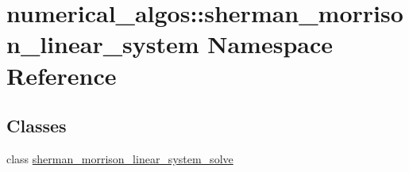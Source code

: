 \hypertarget{namespacenumerical__algos_1_1sherman__morrison__linear__system}{\section{numerical\-\_\-algos\-:\-:sherman\-\_\-morrison\-\_\-linear\-\_\-system Namespace Reference}
\label{namespacenumerical__algos_1_1sherman__morrison__linear__system}
}
\subsection*{Classes}
\begin{DoxyCompactItemize}
\item 
class \hyperlink{classnumerical__algos_1_1sherman__morrison__linear__system_1_1sherman__morrison__linear__system__solve}{sherman\-\_\-morrison\-\_\-linear\-\_\-system\-\_\-solve}
\end{DoxyCompactItemize}
